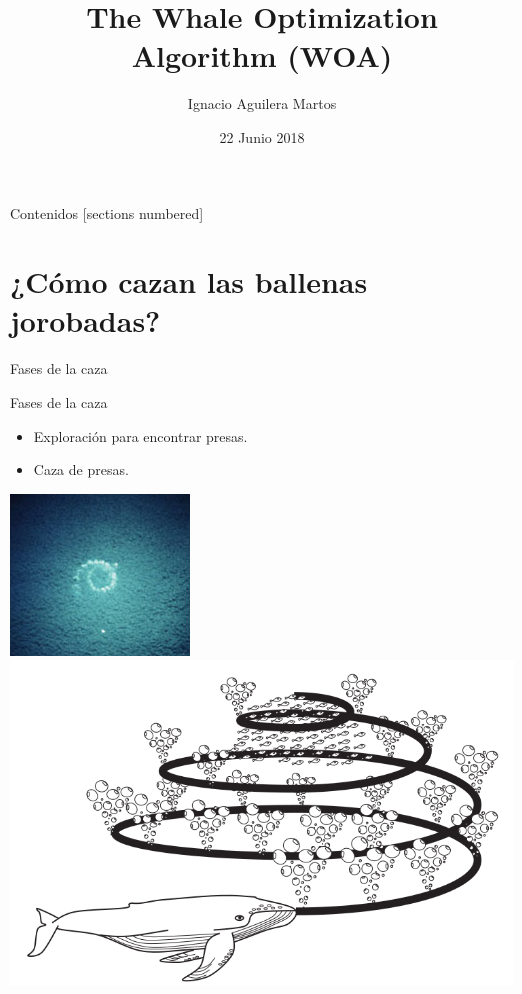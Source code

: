 \documentclass[10pt]{beamer}
\title{The Whale Optimization Algorithm (WOA)}
\author{Ignacio Aguilera Martos}
\date{22 Junio 2018}
\institute{Metaheurísticas}
\begin{document}
\maketitle

\begin{frame}[fragile]{Contenidos}
  [sections numbered]
  \tableofcontents[hideallsubsections]
\end{frame}

\section{¿Cómo cazan las ballenas jorobadas?}

\begin{frame}[fragile]{Fases de la caza}
	\vspace{10px}
	\pause
	\begin{block}{Fases de la caza}
		\begin{itemize}
			\item Exploración para encontrar presas.
			\pause
			\item Caza de presas.
		\end{itemize}
	\end{block}
	\pause
	\begin{center}
		\includegraphics[scale=0.7]{./Imagenes/imagen1.jpg}
		\hspace{10px}
		\includegraphics[scale=0.22]{./Imagenes/imagen2.png}
	\end{center}
\end{frame}
\end{document}
